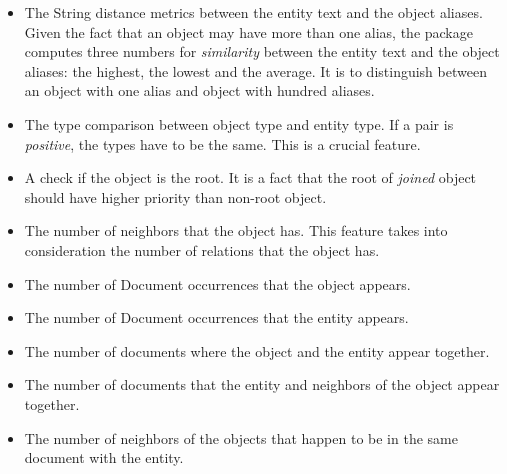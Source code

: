 \begin{itemize}
\item The String distance metrics between the entity text and the object
aliases. Given the fact that an object may have more than one alias, the package
computes three numbers for \textit{similarity} between the entity text and the
object aliases: the highest, the lowest and the average. It is to distinguish
between an object with one alias and object with hundred aliases.
\item The type comparison between object type and entity type. If a pair is
\textit{positive}, the types have to be the same. This is a crucial feature. 
\item A check if the object is the root. It is a fact that the root of
\textit{joined} object should have higher priority than non-root object.
\item The number of neighbors that the object has. This feature takes into
consideration the number of relations that the object has.
\item The number of Document occurrences that the object appears.
\item The number of Document occurrences that the entity appears.
\item The number of documents where the object and the entity appear together.
\item The number of documents that the entity and neighbors of the object appear together.
\item The number of neighbors of the objects that happen to be in the same document with the entity.
\end{itemize}


